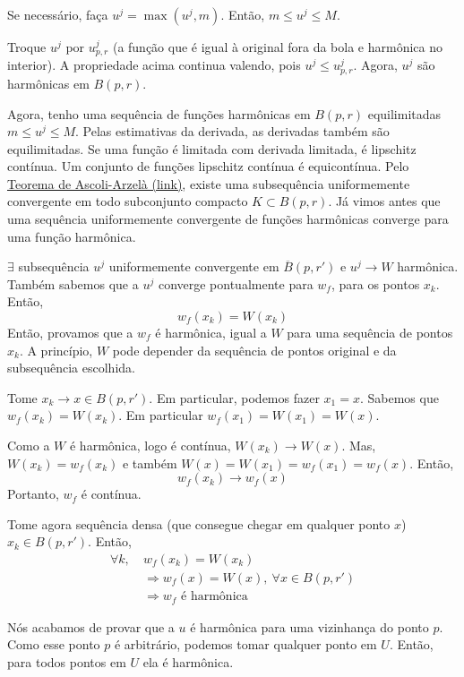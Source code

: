 \documentclass[11pt]{article}
\begin{document}
Se necessário, faça \(u^j = \max(u^j, m)\). Então, \(m \leq u^j \leq M\).

Troque \(u^j\) por \(u^j_{p,r}\) (a função que é igual à original fora da bola e harmônica no interior). A propriedade acima continua valendo, pois \(u^j \leq u^j_{p,r}\). Agora, \(u^j\) são harmônicas em \(B(p,r)\).

Agora, tenho uma sequência de funções harmônicas em \(B(p,r)\) equilimitadas \(m \leq u^j \leq M\). Pelas estimativas da derivada, as derivadas também são equilimitadas. Se uma função é limitada com derivada limitada, é lipschitz contínua. Um conjunto de funções lipschitz contínua é equicontínua. Pelo \href{https://en.wikipedia.org/wiki/Arzel\%C3\%A0\%E2\%80\%93Ascoli_theorem}{Teorema de Ascoli-Arzelà (link)}, existe uma subsequência uniformemente convergente em todo subconjunto compacto \(K \subset B(p,r)\). Já vimos antes que uma sequência uniformemente convergente de funções harmônicas converge para uma função harmônica.

\(\exists\) subsequência \(u^j\) uniformemente convergente em \(\overline{B}(p, r')\) e \(u^j \rightarrow W\) harmônica. Também sabemos que a \(u^j\) converge pontualmente para \(w_f\), para os pontos \(x_k\). Então, \[w_f(x_k) = W(x_k)\]Então, provamos que a \(w_f\) é harmônica, igual a \(W\) para uma sequência de pontos \(x_k\). A princípio,  \(W\) pode depender da sequência de pontos original e da subsequência escolhida.

\medskip

Tome \(x_k \rightarrow x \in B(p, r')\). Em particular, podemos fazer \(x_1 = x\). Sabemos que \(w_f(x_k) = W(x_k)\). Em particular \(w_f(x_1)=W(x_1)=W(x)\).

Como a \(W\) é harmônica, logo é contínua, \(W(x_k)\rightarrow W(x)\). Mas, \(W(x_k) = w_f(x_k)\) e também \(W(x) = W(x_1)=w_f(x_1) = w_f(x)\). Então, \[w_f(x_k) \rightarrow w_f(x)\] Portanto, \(w_f\) é contínua.

Tome agora sequência densa (que consegue chegar em qualquer ponto \(x\)) \(x_k \in B(p,r')\). Então,\vspace{-4mm} \begin{align*}
	\forall k,\ & w_f(x_k)=W(x_k) \\
	&\Rightarrow w_f(x) = W(x),\ \forall x \in B(p, r')\\
	&\Rightarrow w_f \text{ é harmônica}
\end{align*} 

Nós acabamos de provar que a \(u\) é harmônica para uma vizinhança do ponto \(p\). Como esse ponto \(p\) é arbitrário, podemos tomar qualquer ponto em \(U\). Então, para todos pontos em \(U\) ela é harmônica.
\end{document}

